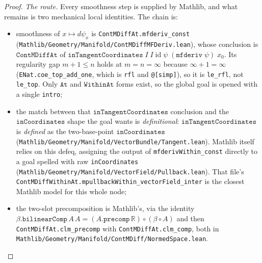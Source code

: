 \begin{proof}
    \emph{The route.} Every smoothness step is supplied by Mathlib, and what remains is two mechanical local identities. The chain is:
    \begin{itemize}
        \item smoothness of $x \mapsto d\psi_x$ is \texttt{ContMDiffAt.mfderiv\_const} (\texttt{Mathlib/Geometry/Manifold/ContMDiffMFDeriv.lean}), whose conclusion is $\mathtt{ContMDiffAt}$ of $\mathtt{inTangentCoordinates}\;I\;I\;\mathrm{id}\;\psi\;(\mathtt{mfderiv}\;\psi)\;x_0$. Its regularity gap $m + 1 \le n$ holds at $m = n = \infty$ because $\infty + 1 = \infty$ (\texttt{ENat.coe\_top\_add\_one}, which is \texttt{rfl} and \texttt{@[simp]}), so it is \texttt{le\_rfl}, not \texttt{le\_top}. Only $\mathtt{At}$ and $\mathtt{WithinAt}$ forms exist, so the global goal is opened with a single \texttt{intro};
        \item the match between that $\mathtt{inTangentCoordinates}$ conclusion and the $\mathtt{inCoordinates}$ shape the goal wants is \emph{definitional}: $\mathtt{inTangentCoordinates}$ is \emph{defined} as the two-base-point $\mathtt{inCoordinates}$ (\texttt{Mathlib/Geometry/Manifold/VectorBundle/Tangent.lean}). Mathlib itself relies on this defeq, assigning the output of \texttt{mfderivWithin\_const} directly to a goal spelled with raw \texttt{inCoordinates} (\texttt{Mathlib/Geometry/Manifold/VectorField/Pullback.lean}). That file's \texttt{ContMDiffWithinAt.mpullbackWithin\_vectorField\_inter} is the closest Mathlib model for this whole node;
        \item the two-slot precomposition is Mathlib's, via the identity $\beta.\mathtt{bilinearComp}\,A\,A = (A.\mathtt{precomp}\,\mathbb{R}) \circ (\beta \circ A)$ and then \texttt{ContMDiffAt.clm\_precomp} with \texttt{ContMDiffAt.clm\_comp}, both in \texttt{Mathlib/Geometry/Manifold/ContMDiff/NormedSpace.lean}.
    \end{itemize}

\end{proof}
